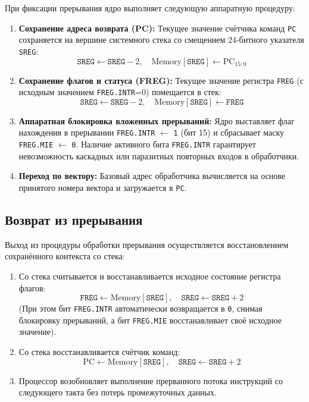\documentclass[11pt,a4paper]{article}
\newcommand{\reg}[1]{\texttt{#1}}
\begin{document}
При фиксации прерывания ядро выполняет следующую аппаратную процедуру:
\begin{enumerate}
  \item \textbf{Сохранение адреса возврата (PC):} Текущее значение счётчика команд \texttt{PC} сохраняется на вершине системного стека со смещением 24-битного указателя \reg{SREG}:
  $$\reg{SREG} \leftarrow \reg{SREG} - 2, \quad \text{Memory}[\reg{SREG}] \leftarrow \text{PC}_{15:0}$$
  \item \textbf{Сохранение флагов и статуса (FREG):} Текущее значение регистра \reg{FREG} (с исходным значением \reg{FREG.INTR}=0) помещается в стек:
  $$\reg{SREG} \leftarrow \reg{SREG} - 2, \quad \text{Memory}[\reg{SREG}] \leftarrow \reg{FREG}$$
  \item \textbf{Аппаратная блокировка вложенных прерываний:} Ядро выставляет флаг нахождения в прерывании \reg{FREG.INTR} $\leftarrow$ \texttt{1} (бит 15) и сбрасывает маску \reg{FREG.MIE} $\leftarrow$ \texttt{0}. Наличие активного бита \reg{FREG.INTR} гарантирует невозможность каскадных или паразитных повторных входов в обработчики.
  \item \textbf{Переход по вектору:} Базовый адрес обработчика вычисляется на основе принятого номера вектора и загружается в \texttt{PC}.
\end{enumerate}

\subsection{Возврат из прерывания}
Выход из процедуры обработки прерывания осуществляется восстановлением сохранённого контекста со стека:
\begin{enumerate}
  \item Со стека считывается и восстанавливается исходное состояние регистра флагов:
  $$\reg{FREG} \leftarrow \text{Memory}[\reg{SREG}], \quad \reg{SREG} \leftarrow \reg{SREG} + 2$$
  (При этом бит \reg{FREG.INTR} автоматически возвращается в \texttt{0}, снимая блокировку прерываний, а бит \reg{FREG.MIE} восстанавливает своё исходное значение).
  \item Со стека восстанавливается счётчик команд:
  $$\text{PC} \leftarrow \text{Memory}[\reg{SREG}], \quad \reg{SREG} \leftarrow \reg{SREG} + 2$$
  \item Процессор возобновляет выполнение прерванного потока инструкций со следующего такта без потерь промежуточных данных.
\end{enumerate}

\clearpage
\end{document}
